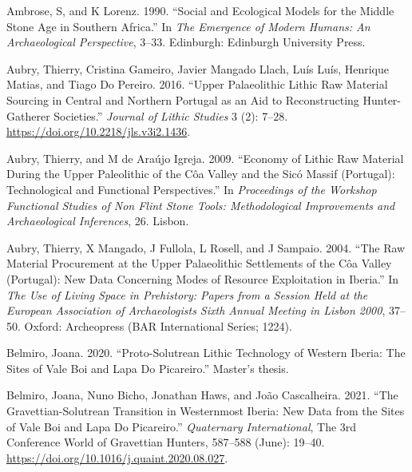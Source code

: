 \documentclass[
  a4paper,
  DIV=11,
  numbers=noendperiod]{scrreprt}
\newlength{\cslhangindent}
\newenvironment{CSLReferences}[2] %
 {\begin{list}{}{%
  \setlength{\itemindent}{0pt}
  \setlength{\leftmargin}{0pt}
  \setlength{\parsep}{0pt}
  \ifodd #1
   \setlength{\leftmargin}{\cslhangindent}
   \setlength{\itemindent}{-1\cslhangindent}
  \fi
  \setlength{\itemsep}{#2\baselineskip}}}
 {\end{list}}
\begin{document}
\label{refs}
\begin{CSLReferences}{1}{0}
Ambrose, S, and K Lorenz. 1990. {``Social and Ecological Models for the
Middle Stone Age in Southern {Africa}.''} In \emph{The Emergence of
Modern Humans: An Archaeological Perspective}, 3--33. Edinburgh:
Edinburgh University Press.

Aubry, Thierry, Cristina Gameiro, Javier Mangado Llach, Luís Luís,
Henrique Matias, and Tiago Do Pereiro. 2016. {``Upper {Palaeolithic}
Lithic Raw Material Sourcing in {Central} and {Northern Portugal} as an
Aid to Reconstructing Hunter-Gatherer Societies.''} \emph{Journal of
Lithic Studies} 3 (2): 7--28.
\url{https://doi.org/10.2218/jls.v3i2.1436}.

Aubry, Thierry, and M de Araújo Igreja. 2009. {``Economy of Lithic Raw
Material During the {Upper Paleolithic} of the {C{ô}a Valley} and the
{Sic{ó} Massif} ({Portugal}): Technological and Functional
Perspectives.''} In \emph{Proceedings of the {Workshop Functional
Studies} of {Non Flint Stone Tools}: {Methodological Improvements} and
{Archaeological Inferences}}, 26. Lisbon.

Aubry, Thierry, X Mangado, J Fullola, L Rosell, and J Sampaio. 2004.
{``The Raw Material Procurement at the {Upper Palaeolithic} Settlements
of the {C{ô}a Valley} ({Portugal}): New Data Concerning Modes of
Resource Exploitation in {Iberia}.''} In \emph{The {Use} of {Living
Space} in {Prehistory}: {Papers} from a Session Held at the {European
Association} of {Archaeologists Sixth Annual Meeting} in {Lisbon} 2000},
37--50. Oxford: Archeopress (BAR International Series; 1224).

Belmiro, Joana. 2020. {``Proto-{Solutrean} Lithic Technology of Western
{Iberia}: The Sites of {Vale Boi} and {Lapa} Do {Picareiro}.''} Master's
thesis.

Belmiro, Joana, Nuno Bicho, Jonathan Haws, and João Cascalheira. 2021.
{``The {Gravettian-Solutrean} Transition in Westernmost {Iberia}: {New}
Data from the Sites of {Vale Boi} and {Lapa} Do {Picareiro}.''}
\emph{Quaternary International}, The 3rd {Conference World} of
{Gravettian Hunters}, 587--588 (June): 19--40.
\url{https://doi.org/10.1016/j.quaint.2020.08.027}.


\end{CSLReferences}
\end{document}

